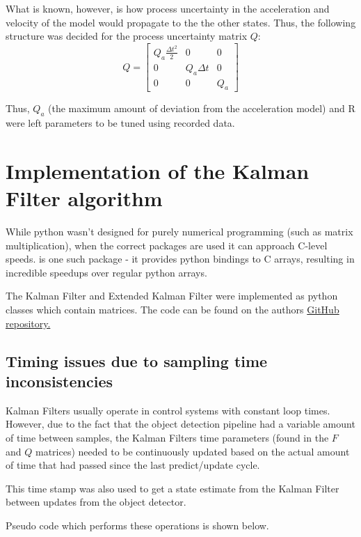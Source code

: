 What is known, however, is how process uncertainty in the acceleration and velocity of the model would propagate to the the other states. Thus, the following structure was decided for the process uncertainty matrix $Q$:
\[ Q = \begin{bmatrix}
	Q_a \frac{\Delta t^2}{2} & 0 & 0 \\
	0 & Q_a \Delta t & 0 \\
	0 & 0 & Q_a \end{bmatrix} \]

Thus, $Q_a$ (the maximum amount of deviation from the acceleration model) and R were left  parameters to be tuned using recorded data.

\section{Implementation of the Kalman Filter algorithm}

While python wasn't designed for purely numerical programming (such as matrix multiplication), when the correct packages are used it can approach C-level speeds.  is one such package - it provides python bindings to C arrays, resulting in incredible speedups over regular python arrays.

The Kalman Filter and Extended Kalman Filter were implemented as python classes which contain  matrices. The code can be found on the authors \href{https://github.com/alknemeyer/EEE4022S-Thesis-Project/blob/master/Final%20code/extended_kalman_filter.ipynb}{GitHub repository.} \\

\subsection{Timing issues due to sampling time inconsistencies}
Kalman Filters usually operate in control systems with constant loop times. However, due to the fact that the object detection pipeline had a variable amount of time between samples, the Kalman Filters time parameters (found in the $F$ and $Q$ matrices) needed to be continuously updated based on the actual amount of time that had passed since the last predict/update cycle.

This time stamp was also used to get a state estimate from the Kalman Filter between updates from the object detector.

Pseudo code which performs these operations is shown below.\\

